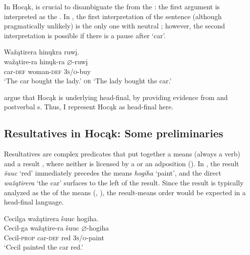 \documentclass[output=paper]{LSP/langsci}
\begin{document}
In Hocąk,  is crucial to disambiguate the  from the : the first argument is interpreted as the . In , the first interpretation of the sentence (although pragmatically unlikely) is the only one with neutral ; however, the second interpretation is  possible if there is a pause after `car'.

\begin{exe}
\ex\label{ex:rosen:6}
 \glll Wažątirera hinųkra ruwį.\\
wažątire-ra hinųk-ra {$\varnothing$}-ruwį\\
car-\textsc{def} woman-\textsc{def} \textsc{3s/o}-buy\\
\glt `The car bought the lady.' \textsc{or} `The lady bought the car.'

\end{exe}
 
\citet{JohnsonRosen2014} argue that Hocąk is underlying head-final, by providing evidence from  and postverbal s. Thus, I represent Hocąk as head-final here.

\subsection{Resultatives in Hocąk: Some preliminaries} 

Resultatives are complex predicates that put together a means  (always a verb) and a result , where neither is licensed by a  or an adposition (\citealt{Williams2008}). In , the result \textit{šuuc} `red' immediately precedes the means \textit{hogiha} `paint', and the direct  \textit{wažątirera} `the car' surfaces to the left of the result. Since the result is typically analyzed as the  of the means (\citealt{Li1999}, \citealt{Williams2008}), the result-means order would be expected in a head-final language.

\begin{exe}

\ex \label{ex:rosen:7}\glll Cecilga wažątirera šuuc hogiha. \\
Cecil-ga  wažątire-ra šuuc {$\varnothing$}-hogiha \\
Cecil-\textsc{prop} car-\textsc{def} red \textsc{3s/o}-paint\\
\glt `Cecil painted the car red.'

\end{exe}
\end{document}
